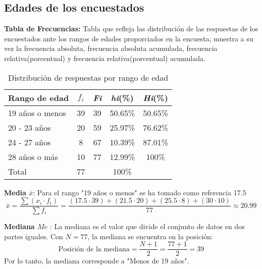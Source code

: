 \subsection{Edades de los encuestados}
	 \textbf{Tabla de Frecuencias:} 
	Tabla que refleja las distribución de las respuestas de los encuestados ante los rangos de edades proporciados en la encuesta; muestra a su vez la frecuencia absoluta, frecuencia absoluta acumulada, frecuencia relativa(porcentual) y frecuencia relativa(porcentual) acumulada.
	
	\begin{table}[h!]
		\centering
		\renewcommand{\arraystretch}{1.2} %
		\begin{tabular}{l c c c c}
			\hline
			{Rango de edad} & {\(f_i\)} & \textit{Fi} & \textit{hi}(\%) & \textit{Hi}(\%)\\
			\hline
			19 años o menos   & 39 & 39 & 50.65\% & 50.65\%\\
			20 - 23 años       & 20 & 59 & 25.97\% & 76.62\%\\
			24 - 27 años       & 8  & 67 & 10.39\% & 87.01\%\\
			28 años o más      & 10 & 77 & 12.99\% & 100\%\\
			\hline
			Total			   & 77 & & 100\% \\
			\hline
		\end{tabular}
		\caption{Distribución de respuestas por rango de edad}
		\label{tabla:edad}
	\end{table}
	 \textbf{Media $\bar{x}$}: Para el rango "19 años o menos" se ha tomado como referencia 17.5
	\begin{equation*}
		\bar{x} = \frac{\sum (x_i \cdot f_i)}{\sum f_i} = \frac{(17.5 \cdot 39) + (21.5 \cdot 20) + (25.5 \cdot 8) + (30 \cdot 10)}{77} \approx 20.99
	\end{equation*}
	
	 \textbf{Mediana $Me$ }: La mediana es el valor que divide el conjunto de datos en dos partes iguales. Con \(N = 77\), la mediana se encuentra en la posición:
	\begin{equation*}
		\text{Posición de la mediana} = \frac{N + 1}{2} = \frac{77 + 1}{2} = 39
	\end{equation*}
	Por lo tanto, la mediana corresponde a "Menos de 19 años".
	
